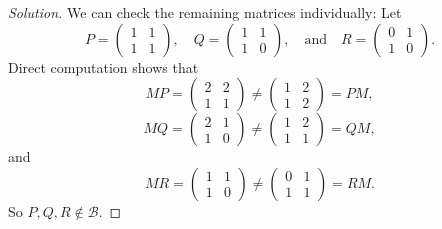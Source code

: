 \begin{proof}[Solution]
  We can check the remaining matrices individually: Let
  \begin{equation*}
    P = \begin{pmatrix}
      1 & 1\\
      1 & 1
    \end{pmatrix},\quad
    Q = \begin{pmatrix}
      1 & 1\\
      1 & 0
    \end{pmatrix},\quad\text{and}\quad
    R = \begin{pmatrix}
      0 & 1\\
      1 & 0
    \end{pmatrix}.
  \end{equation*}
  Direct computation shows that
  \begin{equation*}
    MP = \begin{pmatrix}
      2 & 2 \\
      1 & 1
    \end{pmatrix}
    \neq
    \begin{pmatrix}
      1 & 2 \\
      1 & 2
    \end{pmatrix}
    = PM,
  \end{equation*}
  \begin{equation*}
    MQ = \begin{pmatrix}
      2 & 1 \\
      1 & 0
    \end{pmatrix}
    \neq
    \begin{pmatrix}
      1 & 2 \\
      1 & 1
    \end{pmatrix}
    = QM,
  \end{equation*}
  and
  \begin{equation*}
    MR = \begin{pmatrix}
      1 & 1 \\
      1 & 0
    \end{pmatrix}
    \neq
    \begin{pmatrix}
      0 & 1 \\
      1 & 1
    \end{pmatrix}
    = RM.
  \end{equation*}
  So $P, Q, R\not\in\mathcal{B}$.
\end{proof}

